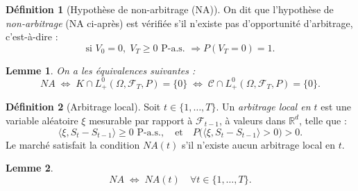 \documentclass[12pt,a4paper]{article}
\numberwithin{equation}{section}
\theoremstyle{plain} %
\newtheorem{lemme}{Lemme}
\theoremstyle{definition} %
\newtheorem{definition}{Définition}          %
\theoremstyle{remark} %
\theoremstyle{myexample}
\theoremstyle{definition}
\begin{document}
\begin{definition}[Hypothèse de non-arbitrage (NA)]
On dit que l’hypothèse de \emph{non-arbitrage} (NA ci-après) est vérifiée s’il n’existe pas d’opportunité d’arbitrage, c’est-à-dire :
\[
\text{si } V_0 = 0, \; V_T \ge 0 \text{ P-a.s. } \Rightarrow P(V_T = 0) = 1.
\]
\end{definition}

\begin{lemme}
On a les équivalences suivantes :
\[
NA \;\Longleftrightarrow\; K \cap L_+^0(\Omega, \mathcal{F}_T, P) = \{0\}
\;\Longleftrightarrow\;
\mathcal{C} \cap L_+^0(\Omega, \mathcal{F}_T, P) = \{0\}.
\]
\end{lemme}

\begin{definition}[Arbitrage local]
Soit $t \in \{1, \dots, T\}$.  
Un \emph{arbitrage local en $t$} est une variable aléatoire $\xi$ mesurable par rapport à $\mathcal{F}_{t-1}$, à valeurs dans $\mathbb{R}^d$, telle que :
\[
\langle \xi, S_t - S_{t-1} \rangle \ge 0 \text{ P-a.s.}, 
\quad \text{et} \quad P\bigl( \langle \xi, S_t - S_{t-1} \rangle > 0 \bigr) > 0.
\]
Le marché satisfait la condition $NA(t)$ s’il n’existe aucun arbitrage local en $t$.
\end{definition}

\begin{lemme}
\[
NA \;\Longleftrightarrow\; NA(t) \quad \forall t \in \{1, \dots, T\}.
\]
\end{lemme}
\end{document}
